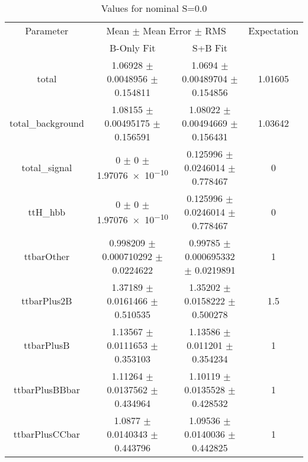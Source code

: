\begin{table}
\centering
\caption{Values for nominal S=0.0}
\begin{tabular}{cccc}
\toprule
Parameter & \multicolumn{2}{c}{Mean $\pm$ Mean Error $\pm$ RMS} & Expectation\\
 & B-Only Fit & S+B Fit & \\
\midrule
total & \num{1.06928} $\pm$ \num{0.0048956} $\pm$ \num{0.154811} & \num{1.0694} $\pm$ \num{0.00489704} $\pm$ \num{0.154856} & \num{1.01605}\\
total\_background & \num{1.08155} $\pm$ \num{0.00495175} $\pm$ \num{0.156591} & \num{1.08022} $\pm$ \num{0.00494669} $\pm$ \num{0.156431} & \num{1.03642}\\
total\_signal & \num{0} $\pm$ \num{0} $\pm$ \num{1.97076e-10} & \num{0.125996} $\pm$ \num{0.0246014} $\pm$ \num{0.778467} & \num{0}\\
ttH\_hbb & \num{0} $\pm$ \num{0} $\pm$ \num{1.97076e-10} & \num{0.125996} $\pm$ \num{0.0246014} $\pm$ \num{0.778467} & \num{0}\\
ttbarOther & \num{0.998209} $\pm$ \num{0.000710292} $\pm$ \num{0.0224622} & \num{0.99785} $\pm$ \num{0.000695332} $\pm$ \num{0.0219891} & \num{1}\\
ttbarPlus2B & \num{1.37189} $\pm$ \num{0.0161466} $\pm$ \num{0.510535} & \num{1.35202} $\pm$ \num{0.0158222} $\pm$ \num{0.500278} & \num{1.5}\\
ttbarPlusB & \num{1.13567} $\pm$ \num{0.0111653} $\pm$ \num{0.353103} & \num{1.13586} $\pm$ \num{0.011201} $\pm$ \num{0.354234} & \num{1}\\
ttbarPlusBBbar & \num{1.11264} $\pm$ \num{0.0137562} $\pm$ \num{0.434964} & \num{1.10119} $\pm$ \num{0.0135528} $\pm$ \num{0.428532} & \num{1}\\
ttbarPlusCCbar & \num{1.0877} $\pm$ \num{0.0140343} $\pm$ \num{0.443796} & \num{1.09536} $\pm$ \num{0.0140036} $\pm$ \num{0.442825} & \num{1}\\
\bottomrule
\end{tabular}
\end{table}